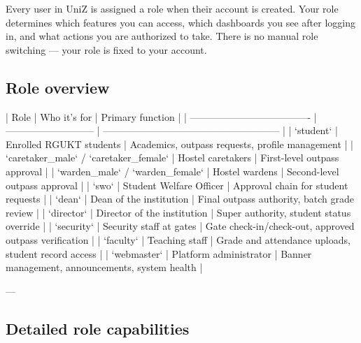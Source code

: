 


Every user in UniZ is assigned a role when their account is created. Your role determines which features you can access, which dashboards you see after logging in, and what actions you are authorized to take. There is no manual role switching — your role is fixed to your account.

\subsection{Role overview}

| Role                                  | Who it's for                | Primary function                                       |
| ------------------------------------- | --------------------------- | ------------------------------------------------------ |
| `student`                             | Enrolled RGUKT students     | Academics, outpass requests, profile management        |
| `caretaker_male` / `caretaker_female` | Hostel caretakers           | First-level outpass approval                           |
| `warden_male` / `warden_female`       | Hostel wardens              | Second-level outpass approval                          |
| `swo`                                 | Student Welfare Officer     | Approval chain for student requests                    |
| `dean`                                | Dean of the institution     | Final outpass authority, batch grade review            |
| `director`                            | Director of the institution | Super authority, student status override               |
| `security`                            | Security staff at gates     | Gate check-in/check-out, approved outpass verification |
| `faculty`                             | Teaching staff              | Grade and attendance uploads, student record access    |
| `webmaster`                           | Platform administrator      | Banner management, announcements, system health        |

---

\subsection{Detailed role capabilities}


